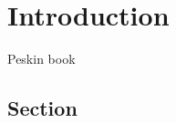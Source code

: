 \pagestyle{plain}

\chapter{Introduction}

\blindtext
Peskin book~\cite{peskin1995introduction}

\section{Section}

\Blindtext
